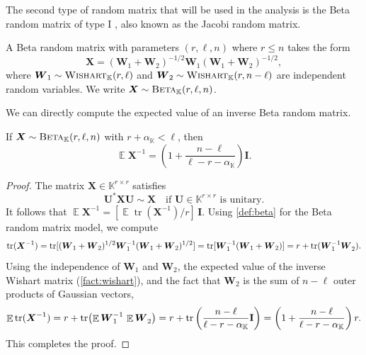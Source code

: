 \documentclass[11pt]{article}
\newcommand{\field}{\mathbb{K}}
\DeclareMathOperator{\tr}{tr}
\newcommand{\mat}[1]{\boldsymbol{#1}}
\newcommand{\Id}{\mathbf{I}}
\DeclareMathOperator{\expect}{\mathbb{E}}
\newcommand{\Wishart}{\textnormal{\textsc{Wishart}}}
\newcommand{\Beta}{\textnormal{\textsc{Beta}}}
\theoremstyle{definition}
\numberwithin{equation}{section}
\begin{document}
The second type of random matrix that will be used in the analysis is the Beta random matrix of type I \cite{Mit70}, also known as the Jacobi random matrix.

\begin{definition} \label{def:beta}
    A Beta random matrix with parameters $(r,\ell,n)$ where $r \leq n$ takes the form
    \begin{equation} \label{eq:wishart-decomposition}
        \mat{X} = (\mat{W}_1+\mat{W}_2)^{-1/2}\mat{W}_1(\mat{W}_1+\mat{W}_2)^{-1/2},
    \end{equation}
    where $\mat{W}_1 \sim \Wishart_\field(r,\ell)$ and $\mat{W}_2\sim \Wishart_\field(r,n-\ell)$ are independent random variables.
    We write $\mat{X} \sim \Beta_\field(r,\ell,n)$.
\end{definition}

\noindent We can directly compute the expected value of an inverse Beta random matrix.

\begin{proposition} \label{prop:beta_exp}
    If $\mat{X} \sim \Beta_\field(r,\ell,n)$ with $r + \alpha_{\field} < \ell$, then
    \begin{equation*}
        \expect \mat{X}^{-1} = \left(1 + \frac{n-\ell}{\ell - r - \alpha_\field}\right) \Id.
    \end{equation*}
\end{proposition}

\begin{proof}
    The matrix $\mat{X} \in \field^{r \times r}$ satisfies
    \begin{equation*}
        \mat{U}^*\mat{X}\mat{U} \sim \mat{X} \quad \text{if } \mat{U} \in \field^{r \times r} \text{ is unitary}.
    \end{equation*}
    It follows that $\expect\mat{X}^{-1} = [\expect \tr(\mat{X}^{-1}) / r]\,\Id$.
    Using \cref{def:beta} for the Beta random matrix model, we compute
    \begin{equation*}
        \tr(\mat{X}^{-1}) = \tr[(\mat{W}_1+\mat{W}_2)^{1/2}\mat{W}_1^{-1}(\mat{W}_1+\mat{W}_2)^{1/2}] = \tr[\mat{W}_1^{-1}(\mat{W}_1+\mat{W}_2)] = r + \tr(\mat{W}_1^{-1}\mat{W}_2^{\vphantom{-1}}).
    \end{equation*}
    Using the independence of $\mat{W}_1$ and $\mat{W}_2$, the expected value of the inverse Wishart matrix (\cref{fact:wishart}), and the fact that $\mat{W}_2$ is the sum of $n-\ell$ outer products of Gaussian vectors,
    \begin{equation*}
        \expect \tr(\mat{X}^{-1}) = r + \tr\bigl( \expect\mat{W}_1^{-1}\,\expect\mat{W}_2^{\vphantom{-1}} \bigr) 
        = r + \tr\left( \frac{n-\ell}{\ell - r - \alpha_\field} \Id \right) = \left(1 + \frac{n-\ell}{\ell - r - \alpha_\field}\right) r.
    \end{equation*}
    This completes the proof.
\end{proof}
\end{document}
